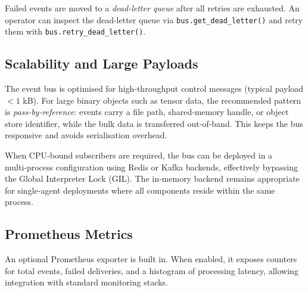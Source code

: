 Failed events are moved to a \emph{dead-letter queue} after all retries are
exhausted.  An operator can inspect the dead-letter queue via
\texttt{bus.get\_dead\_letter()} and retry them with
\texttt{bus.retry\_dead\_letter()}.

\subsection{Scalability and Large Payloads}

The event bus is optimised for high‑throughput control messages (typical
payload $< 1$ kB).  For large binary objects such as tensor data, the
recommended pattern is \emph{pass‑by‑reference}: events carry a file
path, shared‑memory handle, or object store identifier, while the bulk
data is transferred out‑of‑band.  This keeps the bus responsive and
avoids serialisation overhead.

When CPU‑bound subscribers are required, the bus can be deployed in a
multi‑process configuration using Redis or Kafka backends, effectively
bypassing the Global Interpreter Lock (GIL).  The in‑memory backend
remains appropriate for single‑agent deployments where all components
reside within the same process.

\subsection{Prometheus Metrics}

An optional Prometheus exporter is built in.  When enabled, it exposes
counters for total events, failed deliveries, and a histogram of
processing latency, allowing integration with standard monitoring stacks.